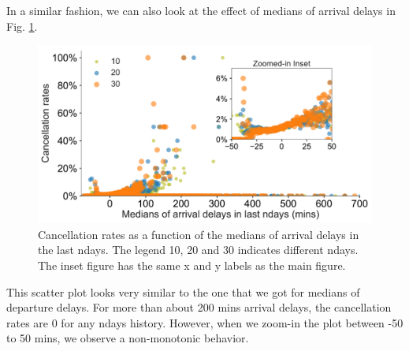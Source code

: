 \documentclass[12pt]{article}
\begin{document}
In a similar fashion, we can also look at the effect of medians of arrival delays in Fig. \ref{fig:arrdelaymediancanrate}.
\begin{figure}[h!]
\begin{center}
\includegraphics[width=6in]{arrdelaymedian_canrate.pdf}
\end{center}
\caption{\label{fig:arrdelaymediancanrate}
Cancellation rates as a function of the medians of arrival delays in the last ndays. The legend 10, 20 and 30 indicates different ndays. The inset figure has the same x and y labels as the main figure.}
\end{figure}
This scatter plot looks very similar to the one that we got for medians of departure delays. For more than about 200 mins arrival delays, the cancellation rates are 0 for any ndays history. However, when we zoom-in the plot between -50 to 50 mins, we observe a non-monotonic behavior.   
\end{document}
